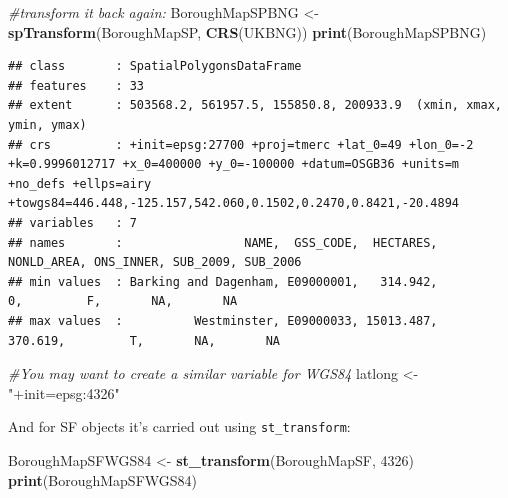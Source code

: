 \documentclass[]{book}
\newenvironment{Shaded}{\begin{snugshade}}{\end{snugshade}}
\newcommand{\CommentTok}[1]{\textcolor[rgb]{0.56,0.35,0.01}{\textit{#1}}}
\newcommand{\DecValTok}[1]{\textcolor[rgb]{0.00,0.00,0.81}{#1}}
\newcommand{\KeywordTok}[1]{\textcolor[rgb]{0.13,0.29,0.53}{\textbf{#1}}}
\newcommand{\NormalTok}[1]{#1}
\newcommand{\StringTok}[1]{\textcolor[rgb]{0.31,0.60,0.02}{#1}}
\begin{document}
\begin{Shaded}
\begin{Highlighting}[]
\CommentTok{#transform it back again:}
\NormalTok{BoroughMapSPBNG <-}\KeywordTok{spTransform}\NormalTok{(BoroughMapSP, }\KeywordTok{CRS}\NormalTok{(UKBNG))}
\KeywordTok{print}\NormalTok{(BoroughMapSPBNG)}
\end{Highlighting}
\end{Shaded}

\begin{verbatim}
## class       : SpatialPolygonsDataFrame 
## features    : 33 
## extent      : 503568.2, 561957.5, 155850.8, 200933.9  (xmin, xmax, ymin, ymax)
## crs         : +init=epsg:27700 +proj=tmerc +lat_0=49 +lon_0=-2 +k=0.9996012717 +x_0=400000 +y_0=-100000 +datum=OSGB36 +units=m +no_defs +ellps=airy +towgs84=446.448,-125.157,542.060,0.1502,0.2470,0.8421,-20.4894 
## variables   : 7
## names       :                 NAME,  GSS_CODE,  HECTARES, NONLD_AREA, ONS_INNER, SUB_2009, SUB_2006 
## min values  : Barking and Dagenham, E09000001,   314.942,          0,         F,       NA,       NA 
## max values  :          Westminster, E09000033, 15013.487,    370.619,         T,       NA,       NA
\end{verbatim}

\begin{Shaded}
\begin{Highlighting}[]
\CommentTok{#You may want to create a similar variable for WGS84}
\NormalTok{latlong <-}\StringTok{ "+init=epsg:4326"}
\end{Highlighting}
\end{Shaded}

And for SF objects it's carried out using \texttt{st\_transform}:

\begin{Shaded}
\begin{Highlighting}[]
\NormalTok{BoroughMapSFWGS84 <-}\StringTok{ }\KeywordTok{st_transform}\NormalTok{(BoroughMapSF, }\DecValTok{4326}\NormalTok{)}
\KeywordTok{print}\NormalTok{(BoroughMapSFWGS84)}
\end{Highlighting}
\end{Shaded}
\end{document}
